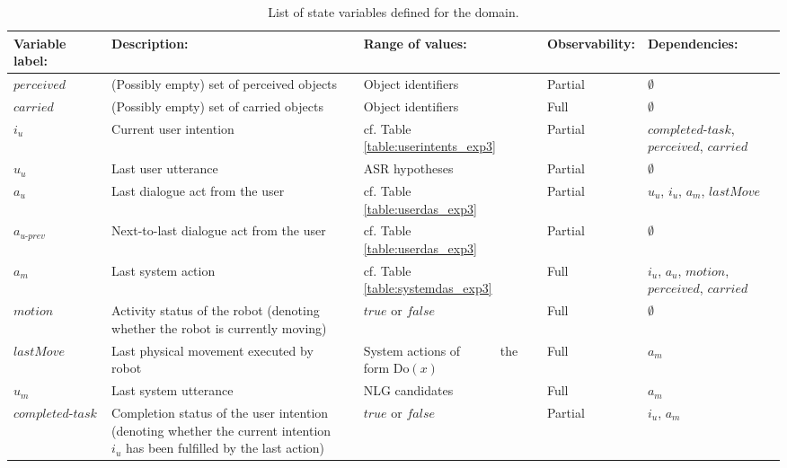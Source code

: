 \renewcommand{\arraystretch}{1.9}
\setlength{\tabcolsep}{8pt}
\begin{table}
\begin{center}
\begin{tabular}{|p{35mm}||p{7cm}p{5mm}|p{34mm}p{5mm}|p{27mm}|p{4cm}|} \hline
\textbf{Variable label:} & \textbf{Description:}  && \textbf{Range of values:} && \textbf{Observability: } & \textbf{Dependencies: }\\ \hline\hline
$\mathit{perceived}$ & (Possibly empty) set of perceived objects && Object identifiers && Partial& $\emptyset$ \\\hline
$\mathit{carried}$ & (Possibly empty) set of carried objects && Object identifiers && Full  & $\emptyset$ \\\hline
$i_u$ & Current user intention && cf. Table \ref{table:userintents_exp3} && Partial  & $\mathit{completed\mbox{-}task}$, $\mathit{perceived}$, $\mathit{carried}$ \\\hline
$u_u$ & Last user utterance && ASR hypotheses && Partial & $\emptyset$ \\ \hline
$a_u$ & Last dialogue act from the user && cf. Table \ref{table:userdas_exp3} && Partial & $u_u$, $i_u$, $a_m$, $\mathit{lastMove}$ \\\hline
$a_{u\mbox{-}prev}$ & Next-to-last dialogue act from the user && cf. Table \ref{table:userdas_exp3} && Partial & $\emptyset$ \\\hline
$a_m$ & Last system action && cf. Table \ref{table:systemdas_exp3} && Full & $i_u$, $a_u$, $\mathit{motion}$, \ \ \ \ \  $\phantom{a}$ $\mathit{perceived}$, $\mathit{carried}$ \\ \hline
$\mathit{motion}$ & Activity status of the robot (denoting whether the robot is currently moving) && $\mathit{true}$ or $\mathit{false}$ && Full  & $\emptyset$  \\\hline
$\mathit{lastMove}$ & Last physical movement executed by robot && System actions of \ \ \ \ $\phantom{a}$ the form $\mathrm{Do}(x)$ && Full & $a_m$ \\\hline
$u_m$ & Last system utterance && NLG candidates && Full & $a_m$ \\ \hline
$\mathit{completed\mbox{-}task}$ & Completion status of the user intention (denoting whether the current intention $i_u$ has been fulfilled by the last action) \vspace{2mm} && $\mathit{true}$ or $\mathit{false}$ && Partial & $i_u$, $a_m$ \\ \hline
\end{tabular}
\end{center}
\caption{List of state variables defined for the domain.}
\label{table:statevariables}
\end{table}


